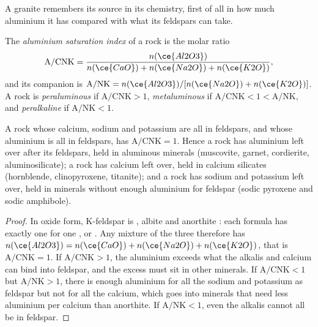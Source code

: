 A granite remembers its source in its chemistry, first of all in how much aluminium it
has compared with what its feldspars can take.

\begin{definition}\label{def:b2:crustal-melting:asi}
The \emph{aluminium saturation index} of a rock is the
molar ratio
\[\mathrm{A/CNK} = \frac{n(\ce{Al2O3})}{n(\ce{CaO}) + n(\ce{Na2O}) + n(\ce{K2O})},\]
and its companion is $\mathrm{A/NK} = n(\ce{Al2O3})/[n(\ce{Na2O}) + n(\ce{K2O})]$. A rock
is \emph{peraluminous} if $\mathrm{A/CNK} > 1$,
\emph{metaluminous} if $\mathrm{A/CNK} < 1 < \mathrm{A/NK}$, and
\emph{peralkaline} if $\mathrm{A/NK} < 1$.
\end{definition}

\begin{proposition}\label{prop:b2:crustal-melting:feldspar}
A rock whose calcium, sodium and potassium are all in feldspars, and whose aluminium is
all in feldspars, has $\mathrm{A/CNK} = 1$. Hence a  rock has aluminium left
over after its feldspars, held in aluminous minerals (muscovite, garnet, cordierite,
aluminosilicate); a  rock has calcium left over, held in calcium silicates
(hornblende, clinopyroxene, titanite); and a  rock has sodium and potassium
left over, held in minerals without enough aluminium for feldspar (sodic pyroxene and
sodic amphibole).
\end{proposition}

\begin{proof}
In oxide form, K-feldspar is , albite  and
anorthite : each formula has exactly one  for one
,  or . Any mixture of the three therefore has $n(\ce{Al2O3}) =
n(\ce{CaO}) + n(\ce{Na2O}) + n(\ce{K2O})$, that is $\mathrm{A/CNK} = 1$. If
$\mathrm{A/CNK} > 1$, the aluminium exceeds what the alkalis and calcium can bind into
feldspar, and the excess must sit in other minerals. If $\mathrm{A/CNK} < 1$ but
$\mathrm{A/NK} > 1$, there is enough aluminium for all the sodium and potassium as
feldspar but not for all the calcium, which goes into minerals that need less aluminium
per calcium than anorthite. If $\mathrm{A/NK} < 1$, even the alkalis cannot all be in
feldspar.
\end{proof}

